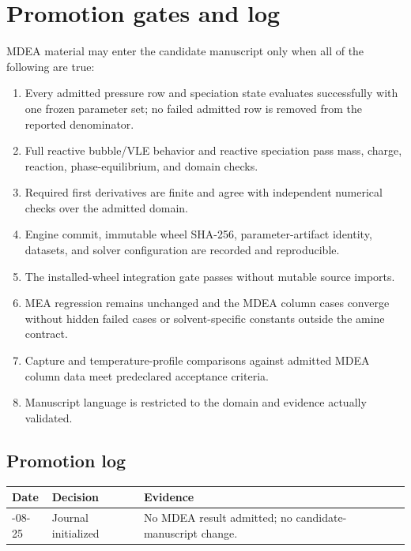 \section{Promotion gates and log}\label{sec:promotion-gates}

MDEA material may enter the candidate manuscript only when all of the following are true:

\begin{enumerate}
  \item Every admitted pressure row and speciation state evaluates successfully with one frozen
  parameter set; no failed admitted row is removed from the reported denominator.
  \item Full reactive bubble/VLE behavior and reactive speciation pass mass, charge, reaction,
  phase-equilibrium, and domain checks.
  \item Required first derivatives are finite and agree with independent numerical checks over
  the admitted domain.
  \item Engine commit, immutable wheel SHA-256, parameter-artifact identity, datasets, and
  solver configuration are recorded and reproducible.
  \item The installed-wheel integration gate passes without mutable source imports.
  \item MEA regression remains unchanged and the MDEA column cases converge without hidden
  failed cases or solvent-specific constants outside the amine contract.
  \item Capture and temperature-profile comparisons against admitted MDEA column data meet
  predeclared acceptance criteria.
  \item Manuscript language is restricted to the domain and evidence actually validated.
\end{enumerate}

\subsection*{Promotion log}

\begin{longtable}{>{\raggedright\arraybackslash}p{} >{\raggedright\arraybackslash}p{} >{\raggedright\arraybackslash}p{}}
\toprule
Date & Decision & Evidence \\
\midrule
2026-08-25 & Journal initialized & No MDEA result admitted; no candidate-manuscript change. \\
\bottomrule
\end{longtable}
